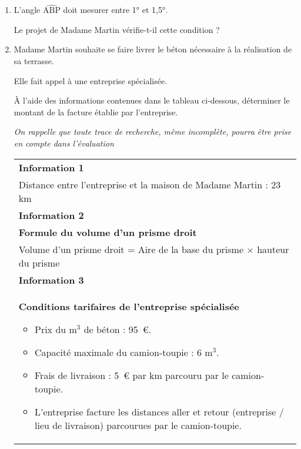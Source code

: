 \begin{enumerate}
	\item L'angle $ \widehat{\text{ABP}} $ doit mesurer entre 1° et 1,5°.
	
	Le projet de Madame Martin vérifie-t-il cette condition ?
	
	\item Madame Martin souhaite se faire livrer le béton nécessaire à la réalisation de sa terrasse.
	
	Elle fait appel à une entreprise spécialisée.
	
	\smallskip
	
	À l'aide des informations contenues dans le tableau ci-dessous, déterminer le montant de la facture établie par l'entreprise.
	
	\medskip
	\textit{On rappelle que toute trace de recherche, même incomplète, pourra être prise en compte dans l'évaluation}
	
	\begin{tabularx}{\linewidth}{|>{\centering \arraybackslash}X|} \hline
		\textbf{Information 1}\\
		Distance entre l'entreprise et la maison de Madame Martin : 23 km\\ \hline
		\textbf{Information 2}\\
		\textbf{Formule du volume d'un prisme droit}\\
		Volume d'un prisme droit = Aire de la base du prisme $\times$ hauteur du prisme \\ \hline
		\textbf{Information 3}\\
		\textbf{Conditions tarifaires de l'entreprise spécialisée}
			\begin{itemize}
				\item Prix du m$^3$ de béton : 95~\euro{}.
				\item Capacité maximale du camion-toupie : 6 m$^3$.
				\item Frais de livraison : 5~\euro{} par km parcouru par le camion-toupie.
				\item L'entreprise facture les distances aller et retour (entreprise / lieu de livraison) parcourues par le camion-toupie.
			\end{itemize}\\ \hline
		\end{tabularx}
\end{enumerate}


